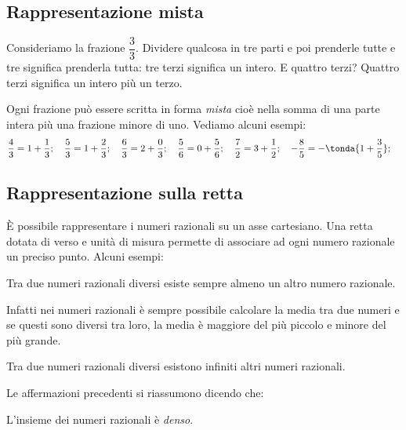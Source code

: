 \subsection{Rappresentazione mista}
\label{sub:razionali_rappresentazione_mista}

Consideriamo la frazione \(\dfrac{3}{3}\). Dividere qualcosa in tre parti e 
poi prenderle tutte e tre significa prenderla tutta: tre terzi significa 
un intero. E quattro terzi? Quattro terzi significa un intero più un terzo.

Ogni frazione può essere scritta in forma \emph{mista} cioè nella somma di 
una parte intera più una frazione minore di uno. Vediamo alcuni esempi:
\[\frac{4}{3} = 1 + \frac{1}{3}; \quad
\frac{5}{3} = 1 + \frac{2}{3}; \quad
\frac{6}{3} = 2 + \frac{0}{3}; \quad
\frac{5}{6} = 0 + \frac{5}{6}; \quad
\frac{7}{2} = 3 + \frac{1}{2}; \quad
-\frac{8}{5} = -\tonda{1 + \frac{3}{5}}; \quad
\]

\subsection{Rappresentazione sulla retta}
\label{sub:razionali_rappresentazione_retta}

È possibile rappresentare i numeri razionali su un asse cartesiano. Una 
retta dotata di verso e unità di misura permette di associare ad ogni 
numero razionale un preciso punto. Alcuni esempi:

\begin{center}
 \rettafra
\end{center}

\begin{teorema}
 Tra due numeri razionali diversi esiste sempre almeno un altro numero 
razionale.
\end{teorema}

Infatti nei numeri razionali è sempre possibile calcolare la media tra due 
numeri e se questi sono diversi tra loro, la media è maggiore del più 
piccolo e minore del più grande.

\begin{corollario}
 Tra due numeri razionali diversi esistono infiniti altri numeri razionali.
\end{corollario}

Le affermazioni precedenti si riassumono dicendo che:

\begin{definizione}
 L'insieme dei numeri razionali è \emph{denso}.
\end{definizione}

